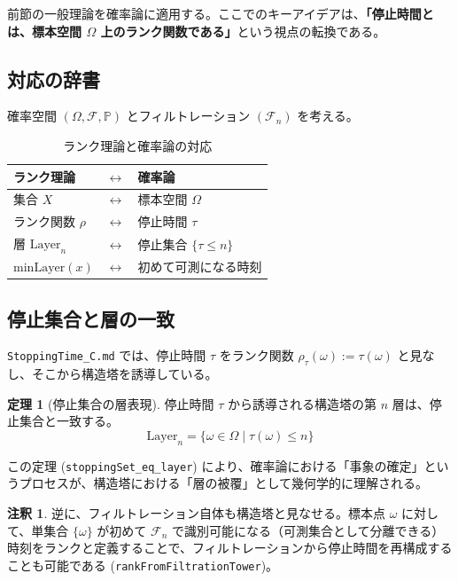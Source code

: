 \documentclass[a4paper,11pt]{ltjsarticle}
\theoremstyle{definition}
\newtheorem{theorem}[definition]{定理}
\newtheorem{remark}[definition]{注釈}
\newcommand{\OmegaSpace}{\Omega}
\newcommand{\F}{\mathcal{F}}
\newcommand{\Prob}{\mathbb{P}}
\newcommand{\Tau}{\tau}
\newcommand{\Rank}{\rho}
\newcommand{\Layer}[1]{\mathrm{Layer}_{#1}}
\newcommand{\MinLayer}{\mathrm{minLayer}}
\begin{document}
前節の一般理論を確率論に適用する。ここでのキーアイデアは、\textbf{「停止時間とは、標本空間 $\OmegaSpace$ 上のランク関数である」}という視点の転換である。

\subsection{対応の辞書}

確率空間 $(\OmegaSpace, \F, \Prob)$ とフィルトレーション $(\F_n)$ を考える。

\begin{table}[h]
\centering
\caption{ランク理論と確率論の対応}
\begin{tabular}{lcl}
\toprule
\textbf{ランク理論} & $\longleftrightarrow$ & \textbf{確率論} \\ \midrule
集合 $X$ & $\longleftrightarrow$ & 標本空間 $\OmegaSpace$ \\
ランク関数 $\Rank$ & $\longleftrightarrow$ & 停止時間 $\Tau$ \\
層 $\Layer{n}$ & $\longleftrightarrow$ & 停止集合 $\{\Tau \le n\}$ \\
$\MinLayer(x)$ & $\longleftrightarrow$ & 初めて可測になる時刻 \\
\bottomrule
\end{tabular}
\end{table}

\subsection{停止集合と層の一致}
\texttt{StoppingTime\_C.md} では、停止時間 $\Tau$ をランク関数 $\Rank_\Tau(\omega) := \Tau(\omega)$ と見なし、そこから構造塔を誘導している。

\begin{theorem}[停止集合の層表現]
停止時間 $\Tau$ から誘導される構造塔の第 $n$ 層は、停止集合と一致する。
\[
    \Layer{n} = \{\omega \in \OmegaSpace \mid \Tau(\omega) \le n\}
\]
\end{theorem}
この定理 (\texttt{stoppingSet\_eq\_layer}) により、確率論における「事象の確定」というプロセスが、構造塔における「層の被覆」として幾何学的に理解される。

\begin{remark}
逆に、フィルトレーション自体も構造塔と見なせる。標本点 $\omega$ に対して、単集合 $\{\omega\}$ が初めて $\F_n$ で識別可能になる（可測集合として分離できる）時刻をランクと定義することで、フィルトレーションから停止時間を再構成することも可能である (\texttt{rankFromFiltrationTower})。
\end{remark}
\end{document}
